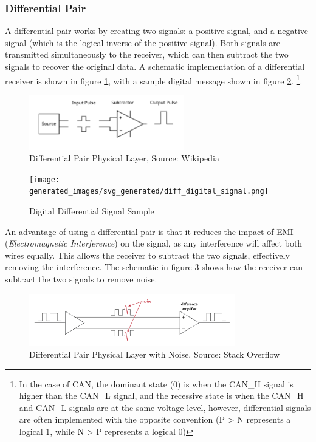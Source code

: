 \documentclass[main.tex]{subfiles}
\begin{document}
\subsubsection{Differential Pair} 
A differential pair works by creating two signals: a positive signal, and a negative signal (which is the logical inverse of the positive signal). Both signals are transmitted simultaneously to the receiver, which can then subtract the two signals to recover the original data. A schematic implementation of a differential receiver is shown in figure \ref{fig:diff-physical-layer}, with a sample digital message shown in figure \ref{fig:diff-digital-sample}. \footnote{In the case of CAN, the dominant state (0) is when the CAN\_H signal is higher than the CAN\_L signal, and the recessive state is when the CAN\_H and CAN\_L signals are at the same voltage level, however, differential signals are often implemented with the opposite convention (P > N represents a logical 1, while N > P represents a logical 0)}.
\begin{figure}[H]
    \centering
    \includegraphics[width=0.6\textwidth]{images/wikipedia_diff_signal.png}
    \caption{Differential Pair Physical Layer, Source: Wikipedia \cite{wikipedia_differential_signalling}}
    \label{fig:diff-physical-layer}
\end{figure}
\begin{figure}[H]
    \centering
    \texttt{[image: generated\_images/svg\_generated/diff\_digital\_signal.png]}
    \caption{Digital Differential Signal Sample}
    \label{fig:diff-digital-sample}
\end{figure}

\noindent An advantage of using a differential pair is that it reduces the impact of EMI (\textit{Electromagnetic Interference}) on the signal, as any interference will affect both wires equally. This allows the receiver to subtract the two signals, effectively removing the interference. The schematic in figure \ref{fig:diff-physical-layer-noise} shows how the receiver can subtract the two signals to remove noise.

\begin{figure}[H]
    \centering
    \includegraphics[width=0.8\textwidth]{images/diff_pair_noise_immunity.png}
    \caption{Differential Pair Physical Layer with Noise, Source: Stack Overflow \cite{stackoverflow_diff_pair_noise}}
    \label{fig:diff-physical-layer-noise}
\end{figure}
\end{document}
